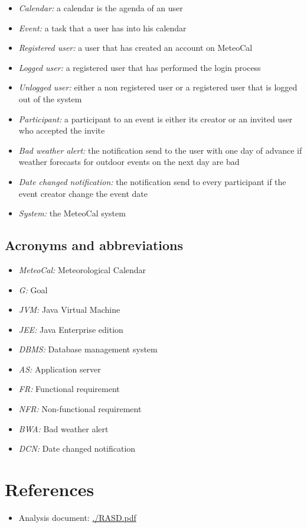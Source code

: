 \documentclass[10pt,a4paper,titlepage]{article}
\begin{document}
\begin{itemize}
\item \emph{Calendar:} a calendar is the agenda of an user
\item \emph{Event:} a task that a user has into his calendar
\item \emph{Registered user:} a user that has created an account on MeteoCal
\item \emph{Logged user:} a registered user that has performed the login process
\item \emph{Unlogged user:} either a non registered user or a registered user that is logged out of the system
\item \emph{Participant:} a participant to an event is either its creator or an invited user who accepted the invite
\item \emph{Bad weather alert:} the notification send to the user with one day of advance if weather forecasts for outdoor events on the next day are bad
\item \emph{Date changed notification:} the notification send to every participant if the event creator change the event date
\item \emph{System:} the MeteoCal system
\end{itemize}

\subsection{Acronyms and abbreviations}
\begin{itemize}
\item \emph{MeteoCal:} Meteorological Calendar
\item \emph{G:} Goal
\item \emph{JVM:} Java Virtual Machine
\item \emph{JEE:} Java Enterprise edition
\item \emph{DBMS:} Database management system
\item \emph{AS:} Application server
\item \emph{FR:} Functional requirement
\item \emph{NFR:} Non-functional requirement
\item \emph{BWA:} Bad weather alert
\item \emph{DCN:} Date changed notification
\end{itemize}

\section{References}
\begin{itemize}
\item Analysis document: \url{./RASD.pdf}
\end{itemize}
\end{document}
